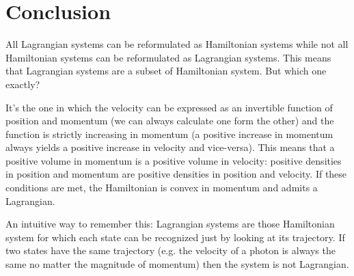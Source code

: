 \documentclass[aps,pra,10pt,floatfix,nofootinbib]{revtex4-1}
\theoremstyle{definition}
\begin{document}
\section{Conclusion}

All Lagrangian systems can be reformulated as Hamiltonian systems while not all Hamiltonian systems can be reformulated as Lagrangian systems. This means that Lagrangian systems are a subset of Hamiltonian system. But which one exactly?

It's the one in which the velocity can be expressed as an invertible function of position and momentum (we can always calculate one form the other) and the function is strictly increasing in momentum (a positive increase in momentum always yields a positive increase in velocity and vice-versa). This means that a positive volume in momentum is a positive volume in velocity: positive densities in position and momentum are positive densities in position and velocity. If these conditions are met, the Hamiltonian is convex in momentum and admits a Lagrangian.

An intuitive way to remember this: Lagrangian systems are those Hamiltonian system for which each state can be recognized just by looking at its trajectory. If two states have the same trajectory (e.g. the velocity of a photon is always the same no matter the magnitude of momentum) then the system is not Lagrangian.
\end{document}
